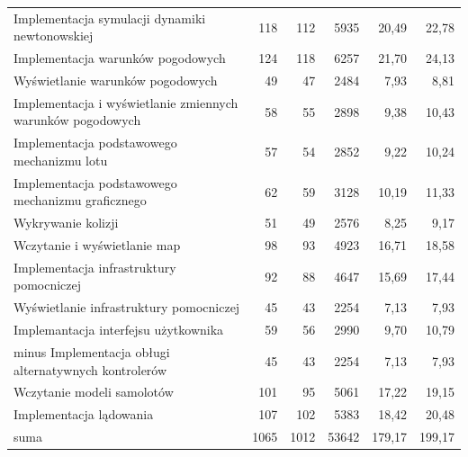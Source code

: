\documentclass{mwrep}
\newcommand{\fixedspaceword}[2][1]{%
  \begingroup
  \spaceskip=#1\fontdimen2\font minus \fontdimen4\font
  \xspaceskip=0pt\relax %
  #2%
  \endgroup
}
\begin{document}
\begin{table}
\begin{center}
\begin{tabular}{|p{7cm}|r|r|r|r|r|}
            Implementacja symulacji dynamiki newtonowskiej                      & 118     & 112     & 5935     & 20,49   & 22,78 \\
            Implementacja warunków pogodowych                                   & 124     & 118     & 6257     & 21,70   & 24,13 \\
            Wyświetlanie warunków pogodowych                                    & 49      & 47      & 2484     & 7,93    & 8,81  \\
            Implementacja i wyświetlanie zmiennych warunków pogodowych          & 58      & 55      & 2898     & 9,38    & 10,43 \\
            Implementacja podstawowego mechanizmu lotu                          & 57      & 54      & 2852     & 9,22    & 10,24 \\
            Implementacja podstawowego mechanizmu graficznego                   & 62      & 59      & 3128     & 10,19   & 11,33 \\
            Wykrywanie kolizji                                                  & 51      & 49      & 2576     & 8,25    & 9,17  \\
            Wczytanie i wyświetlanie map                                        & 98      & 93      & 4923     & 16,71   & 18,58 \\
            Implementacja infrastruktury pomocniczej                            & 92      & 88      & 4647     & 15,69   & 17,44 \\
            Wyświetlanie infrastruktury pomocniczej                             & 45      & 43      & 2254     & 7,13    & 7,93  \\
            Implemantacja interfejsu użytkownika                                & 59      & 56      & 2990     & 9,70    & 10,79 \\
            \fixedspaceword{Implementacja obługi alternatywnych kontrolerów}    & 45      & 43      & 2254     & 7,13    & 7,93  \\
            Wczytanie modeli samolotów                                          & 101     & 95      & 5061     & 17,22   & 19,15 \\
            Implementacja lądowania                                             & 107     & 102     & 5383     & 18,42   & 20,48 \\
            \hline
            \hfill suma                                                         & 1065    & 1012    & 53642    & 179,17  & 199,17\\ \hline
        \end{tabular}
    \end{center}
\end{table}
\end{document}
